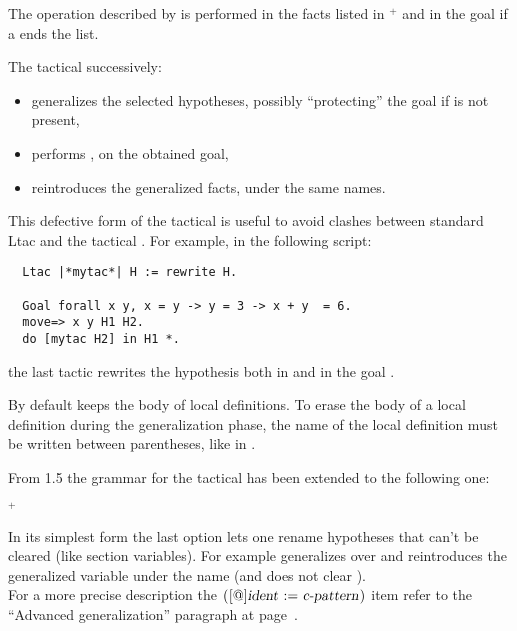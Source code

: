The operation described by {\tac} is performed in the facts
listed in $^+$ and in the goal if a \ssrC{*} ends
the list.

The  tactical successively:
\begin{itemize}
\item generalizes the selected hypotheses, possibly ``protecting'' the
 goal if \ssrC{*} is not present,
\item performs {\tac}, on the obtained goal,
\item reintroduces the generalized facts, under the same names.
\end{itemize}

This defective form of the  tactical is useful to avoid clashes
between standard Ltac  and the \ssr{} tactical .
For example, in the following script:
\begin{lstlisting}
  Ltac |*mytac*| H := rewrite H.

  Goal forall x y, x = y -> y = 3 -> x + y  = 6.
  move=> x y H1 H2.
  do [mytac H2] in H1 *.
\end{lstlisting}
the last tactic rewrites the hypothesis  both in
 and in the goal .

By default  keeps the body of local definitions. To erase
the body of a local definition during the generalization phase,
the name of the local definition must be written between parentheses,
like in .

From \ssr{} 1.5 the grammar for the  tactical has been extended
to the following one:

\begin{center}
  {\tac}  $^+$ \optional{\ssrC{*}}
\end{center}

In its simplest form the last option lets one rename hypotheses that can't be
cleared (like section variables).  For example  generalizes
over  and reintroduces the generalized
variable under the name  (and does not clear ).\\
For a more precise description the $\ssrC{(}[\ssrC{@}]\ssrN{ident}\ \ssrC{:=}\ \ssrN{c-pattern}\ssrC{)}$
item refer to the ``Advanced generalization'' paragraph at page~\pageref{par:advancedgen}.

